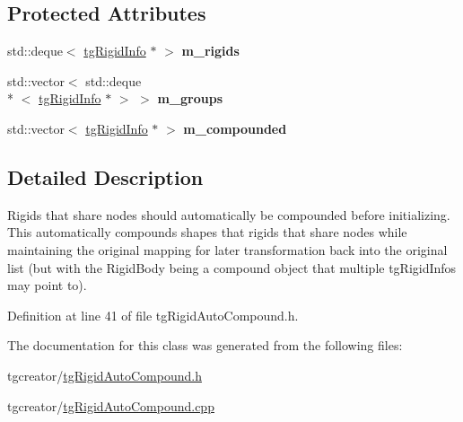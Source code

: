 \subsection*{Protected Attributes}
\begin{DoxyCompactItemize}
\item 
\hypertarget{classtg_rigid_auto_compound_a7753a2539060e4e7c3ffeb923ea9a016}{std\-::deque$<$ \hyperlink{classtg_rigid_info}{tg\-Rigid\-Info} $\ast$ $>$ {\bfseries m\-\_\-rigids}}\label{classtg_rigid_auto_compound_a7753a2539060e4e7c3ffeb923ea9a016}

\item 
\hypertarget{classtg_rigid_auto_compound_a707e58d7277ab57e647674869a43131e}{std\-::vector$<$ std\-::deque\\*
$<$ \hyperlink{classtg_rigid_info}{tg\-Rigid\-Info} $\ast$ $>$ $>$ {\bfseries m\-\_\-groups}}\label{classtg_rigid_auto_compound_a707e58d7277ab57e647674869a43131e}

\item 
\hypertarget{classtg_rigid_auto_compound_a74bcd8da2e7c3e504ffa9c806ad54661}{std\-::vector$<$ \hyperlink{classtg_rigid_info}{tg\-Rigid\-Info} $\ast$ $>$ {\bfseries m\-\_\-compounded}}\label{classtg_rigid_auto_compound_a74bcd8da2e7c3e504ffa9c806ad54661}

\end{DoxyCompactItemize}


\subsection{Detailed Description}
Rigids that share nodes should automatically be compounded before initializing. This automatically compounds shapes that rigids that share nodes while maintaining the original mapping for later transformation back into the original list (but with the Rigid\-Body being a compound object that multiple tg\-Rigid\-Infos may point to). 

Definition at line 41 of file tg\-Rigid\-Auto\-Compound.\-h.



The documentation for this class was generated from the following files\-:\begin{DoxyCompactItemize}
\item 
tgcreator/\hyperlink{tg_rigid_auto_compound_8h}{tg\-Rigid\-Auto\-Compound.\-h}\item 
tgcreator/\hyperlink{tg_rigid_auto_compound_8cpp}{tg\-Rigid\-Auto\-Compound.\-cpp}\end{DoxyCompactItemize}
